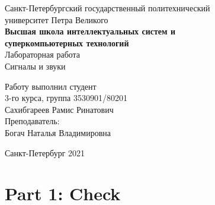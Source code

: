 \documentclass[a4paper]{article}
\begin{document}
    \begin{center}
        \begin{center}
        \hfill \break
        \normalsize{Санкт-Петербургский государственный политехнический}\\
        \normalsize{университет Петра Великого}\\
        \hfill \break
        \normalsize{\textbf{Высшая школа интеллектуальных систем и}}\\ 
        \normalsize{\textbf{суперкомпьютерных технологий}}\\ 
        \hfill \break
        \hfill \break
        \hfill \break
        \normalsize{Лабораторная работа}\\
        \hfill \break
        \hfill \break
        \normalsize{\LARGE Сигналы и звуки}\\
        \end{center}
        \hfill \break
        \hfill \break
        \hfill \break
        \hfill \break
        \hfill \break
        \hfill \break
        \hfill \break
        \hfill \break
        \hfill \break
        \hfill \break
        \begin{flushright}
            \normalsize{Работу выполнил студент}\\
            \normalsize{3-го курса, группа 3530901/80201}\\
            \normalsize{Сахибгареев Рамис Ринатович}\\
            \hfill \break
            \normalsize{Преподаватель:}\\
            \normalsize{Богач Наталья Владимировна}\\
        \end{flushright}
        \hfill \break
        \hfill \break
        \hfill \break
        \hfill \break
        \begin{center} Санкт-Петербург 2021 \end{center}
        \thispagestyle{empty}
    \end{center}
    
    \newpage
        \tableofcontents
    
    \newpage
         \listoffigures
    
    \newpage
         \lstlistoflistings   
     
    \newpage
        \section{Part 1: Check}
        
\end{document}
